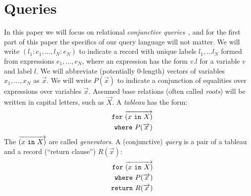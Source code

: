 \documentclass{sigplanconf}
\newcommand{\FOR}{{\tt for}\relax\ifmmode\ \else\xspace\fi}
\newcommand{\WHERE}{{\tt where}\relax\ifmmode\ \else\xspace\fi}
\newcommand{\IN}{ \ {\tt in} \ }
\newcommand{\RETURN}{{\tt return}\relax\ifmmode\ \else\xspace\fi}
\begin{document}
\section{Queries}

In this paper we will focus on relational {\it conjunctive queries}~\cite{foundations}, and for the first part of this paper the specifics of our query language will not matter.   We will write $(l_1: e_1, \ldots, l_N: e_N)$ to indicate a record with unique labels $l_1, \ldots l_N$ formed from expressions $e_1, \ldots, e_N$, where an expression has the form $v.l$ for a variable $v$ and label $l$.  We will abbreviate (potentially 0-length) vectors of variables $x_1,...,x_N$ as $\overrightarrow{x}$.  We will write $P(\overrightarrow{x})$ to indicate a conjunction of equalities over expressions over variables $\overrightarrow{x}$.  Assumed base relations (often called {\it roots}) will be written in capital letters, such as $\overrightarrow{X}$.  A {\it tableau} has the form:
\begin{eqnarray*}
 & & \FOR \overrightarrow{(x \IN X)} \\
 & & \WHERE P(\overrightarrow{x})
\end{eqnarray*}
The $\overrightarrow{(x \IN X)}$ are called {\it generators}.  A (conjunctive) {\it query} is a pair of a  tableau and a record (``return clause'') $R(\overrightarrow{x})$:
\begin{eqnarray*}
 & & \FOR \overrightarrow{(x \IN X)} \\
& & \WHERE  P(\overrightarrow{x}) \\ 
 & & \RETURN R(\overrightarrow{x})
\end{eqnarray*}
\end{document}
